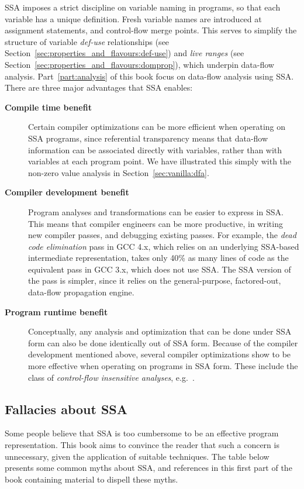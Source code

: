 SSA imposes a strict discipline on variable naming in programs,
so that each variable has a unique definition.
Fresh variable names are introduced at assignment statements,
and control-flow merge points.
This serves to simplify the structure of variable \emph{def-use} 
relationships (see Section~\ref{sec:properties_and_flavours:def-use}) 
and \emph{live ranges} (see Section~\ref{sec:properties_and_flavours:domprop}),
which underpin data-flow analysis. Part~\ref{part:analysis} of this book focus
on data-flow analysis using SSA. There are three major advantages that SSA enables:
\begin{description}
\item[\textbf{Compile time benefit}]
Certain compiler optimizations can be more efficient
when operating on SSA programs, since
referential transparency means that data-flow information
can be associated directly with variables, rather than with variables
at each program point. We have illustrated this simply with the
non-zero value analysis in Section~\ref{sec:vanilla:dfa}.
\item[\textbf{Compiler development benefit}]
Program analyses and transformations can be easier
to express in SSA. This means that compiler engineers
can be more productive, in writing new compiler passes,
and debugging existing passes.
For example, the \textit{dead code elimination} pass
in GCC 4.x, which relies on an underlying SSA-based intermediate
representation, takes only 40\% as many lines of code
as the equivalent pass in GCC 3.x, which does not use SSA.
The SSA version of the pass is simpler, since it
relies on the general-purpose, factored-out, data-flow propagation
engine.
\item[\textbf{Program runtime benefit}]
Conceptually, any analysis and optimization that can be done under SSA form can also be done identically out of SSA form. Because of the compiler development mentioned above, several compiler optimizations show to be more effective
when operating on programs in SSA form. These include the
class of \textit{control-flow insensitive analyses}, e.g.\
\cite{hasti98using}.
\end{description}


\vspace{-2ex}
\subsection{Fallacies about SSA}

Some people believe that SSA is too cumbersome to be an effective
program representation. 
This book aims to convince the reader that
such a concern is
unnecessary,
given the application of suitable techniques.
The table below presents some common myths
about SSA,
and references in this
first part of the book 
containing material to dispell
these myths.

